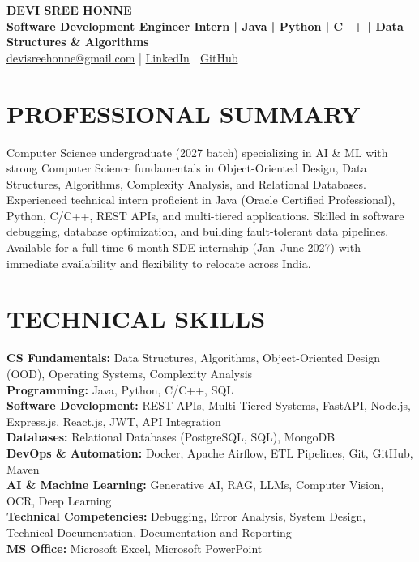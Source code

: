 \documentclass[a4paper,10pt]{article}
\begin{document}
\begin{center}
    {\LARGE \textbf{DEVI SREE HONNE}}\\[4pt]

    {\normalsize
    \textbf{Software Development Engineer Intern | Java | Python | C++ | Data Structures \& Algorithms}
    }\\[5pt]

    \small
    \href{mailto:devisreehonne@gmail.com}
    {devisreehonne@gmail.com}
    \quad | \quad
    \href{https://www.linkedin.com/in/devisreehonne/}
    {LinkedIn}
    \quad | \quad
    \href{https://github.com/devhonne}
    {GitHub}
\end{center}

\section*{PROFESSIONAL SUMMARY}

Computer Science undergraduate (2027 batch) specializing in AI \& ML with strong Computer Science fundamentals in Object-Oriented Design, Data Structures, Algorithms, Complexity Analysis, and Relational Databases. Experienced technical intern proficient in Java (Oracle Certified Professional), Python, C/C++, REST APIs, and multi-tiered applications. Skilled in software debugging, database optimization, and building fault-tolerant data pipelines. Available for a full-time 6-month SDE internship (Jan--June 2027) with immediate availability and flexibility to relocate across India.

\section*{TECHNICAL SKILLS}

\textbf{CS Fundamentals:} Data Structures, Algorithms, Object-Oriented Design (OOD), Operating Systems, Complexity Analysis\\
\textbf{Programming:} Java, Python, C/C++, SQL\\
\textbf{Software Development:} REST APIs, Multi-Tiered Systems, FastAPI, Node.js, Express.js, React.js, JWT, API Integration\\
\textbf{Databases:} Relational Databases (PostgreSQL, SQL), MongoDB\\
\textbf{DevOps \& Automation:} Docker, Apache Airflow, ETL Pipelines, Git, GitHub, Maven\\
\textbf{AI \& Machine Learning:} Generative AI, RAG, LLMs, Computer Vision, OCR, Deep Learning\\
\textbf{Technical Competencies:} Debugging, Error Analysis, System Design, Technical Documentation, Documentation and Reporting\\
\textbf{MS Office:} Microsoft Excel, Microsoft PowerPoint
\end{document}
